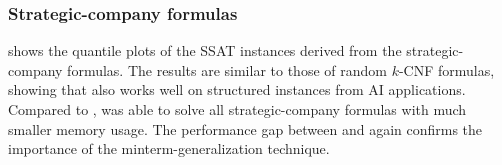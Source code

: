 \subsubsection{Strategic-company formulas}

 shows the quantile plots of the SSAT instances
derived from the strategic-company formulas.
The results are similar to those of random $k$-CNF formulas,
showing that \ressat also works well on structured instances from AI applications.
Compared to \dcssat,
\ressat was able to solve all strategic-company formulas with much smaller memory usage.
The performance gap between \ressat and \ressatb again confirms the importance of the minterm-generalization technique.

\begin{figure}[hp]
    \centering
    \\
\end{figure}
